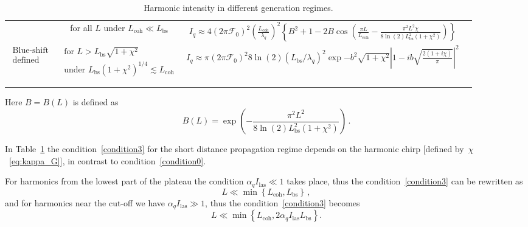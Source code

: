 \begin{table}[h!]
\begin{tabular}{ | c | c | c  c| }
&
for all $L$ under $L_\mathrm{coh} \ll L_\mathrm{bs}$ 
& 
$
\displaystyle
I_q \approx 4 (2 \pi \mathcal{F}_0 )^2 \left( \frac{L_\mathrm{coh}}{\lambda_q}\right)^2
\left\{B^2+1-2 B \cos\left(\frac{\pi L}{L_\mathrm{coh}}-\frac{\pi^2 L^2 \chi}{8\ln(2) L_\mathrm{bs}^2 (1+ \chi^2)}\right) \right\}
$
%
&
\begin{minipage}{\equationlengthtabletwo}
\begin{equation} \label{int_all_L} \end{equation}
\end{minipage}
%
\\ 
%
$\begin{array}{c}
\text{Blue-shift} \\ \text{defined}
\end{array}$
&
$\begin{array}{c}
\text{for }L>L_\mathrm{bs} \sqrt{1+\chi^2} \\
\text{under } L_\mathrm{bs} \left(1+\chi^2 \right)^{1/4} \lesssim L_\mathrm{coh} \\
\end{array}$
&
$
\displaystyle
I_q \approx  \pi (2 \pi \mathcal{F}_0 )^2  8 \ln(2) (L_\mathrm{bs}/ \lambda_q)^2  \exp{-b^2} \sqrt{1+ \chi^2} \left| 1- i b \sqrt{\frac{2 (1+i\chi)}{\pi}}\right|^2 
$
%
&
\begin{minipage}{\equationlengthtabletwo}
\begin{equation} \label{int_long_L} \end{equation}
\end{minipage}
\\
&&& \\
\hline
\end{tabular}
\caption{Harmonic intensity in different generation regimes.}
\label{tab:harm_int_limits}
\end{table}

\noindent
Here $B=B(L)$ is defined as
$$
B(L)=\exp\left( - \frac{\pi^2 L^2}{8\ln(2) L_\mathrm{bs}^2 (1+\chi^2)}\right) \, . 
$$

In Table~\ref{tab:harm_int_limits} the condition~\eqref{condition3} for the short distance propagation regime depends on the harmonic chirp [defined by~$\chi$~\eqref{eq:kappa_G}], in contrast to condition~\eqref{condition0}. 

For harmonics from the lowest part of the plateau the condition $\alpha_q I_\mathrm{las} \ll 1$ takes place, thus the condition~\eqref{condition3} can be rewritten as
\begin{equation}
L\ll \min \left\{L_\mathrm{coh}, L_\mathrm{bs} \right\} \, ,
\label{condition4}
\end{equation}
and for harmonics near the cut-off we have $\alpha_q I_\mathrm{las} \gg 1$, thus the condition~\eqref{condition3} becomes
\begin{equation}
L\ll \min \left\{L_\mathrm{coh}, 2 \alpha_q I_\mathrm{las}  L_\mathrm{bs} \right\}.
\label{condition5}
\end{equation}

